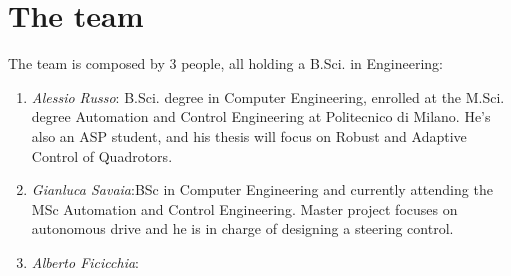 \chapter*{The team}

The team is composed by 3 people, all holding a B.Sci. in Engineering: 
\begin{enumerate}
\item \emph{Alessio Russo}: B.Sci. degree in Computer Engineering, enrolled at the M.Sci. degree Automation and Control Engineering at Politecnico di Milano. He's also an ASP student, and his thesis will focus on Robust and Adaptive Control of Quadrotors.
\item \emph{Gianluca Savaia}:BSc in Computer Engineering and currently attending the MSc Automation and Control Engineering. Master project focuses on autonomous drive and he is in charge of designing a steering control.

\item \emph{Alberto Ficicchia}:
\end{enumerate}